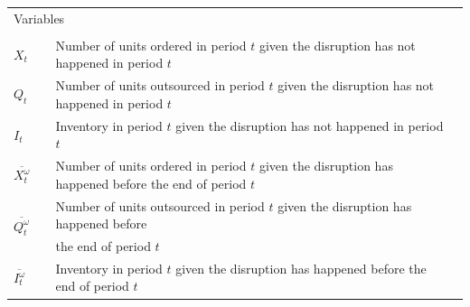 \documentclass[11pt]{article}
\newcommand{\ms}{\medskip}
\begin{document}
\begin{table}[H]
\begin{tabular}{ l l l l }
				\multicolumn{4}{l}{Variables} \\
				\\
				\(X_t\) & \qquad & Number of units ordered in period \(t\) given the disruption has not happened in period \(t\)& \ms\\
				\(Q_t\) & \qquad & Number of units outsourced in period \(t\) given the disruption has not happened in period \(t\)& \ms\\
				\(I_t\) & \qquad & Inventory in period \(t\) given the disruption has not happened in period \(t\)& \ms\\
				\(\overline{X_t^\omega}\) & \qquad & Number of units ordered in period \(t\) given the disruption has happened before the end of period \(t\)& \ms\\
				\multirow{2}{*}{\(\overline{Q_t^\omega}\)} & \qquad & Number of units outsourced in period \(t\) given the disruption has happened before \\ & \qquad & the end of period \(t\)& \ms\\
				\(\overline{I_t^\omega}\) & \qquad & Inventory in period \(t\) given the disruption has happened before the end of period \(t\)& \ms\\
			\end{tabular}
		\end{table}
		
\end{document}
